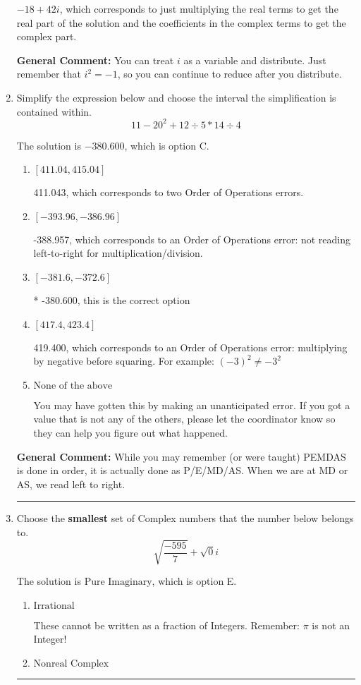 \documentclass{extbook}[14pt]
\newcommand{\litem}[1]{\item #1

\rule{\textwidth}{0.4pt}}
\begin{document}
\begin{enumerate}
{\begin{enumerate}[label=\Alph*.]
 $-18 + 42 i$, which corresponds to just multiplying the real terms to get the real part of the solution and the coefficients in the complex terms to get the complex part.
\end{enumerate}

\textbf{General Comment:} You can treat $i$ as a variable and distribute. Just remember that $i^2=-1$, so you can continue to reduce after you distribute.
}
\litem{
Simplify the expression below and choose the interval the simplification is contained within.
\[ 11 - 20^2 + 12 \div 5 * 14 \div 4 \]

The solution is \( -380.600 \), which is option C.\begin{enumerate}[label=\Alph*.]
\item \( [411.04, 415.04] \)

 411.043, which corresponds to two Order of Operations errors.
\item \( [-393.96, -386.96] \)

 -388.957, which corresponds to an Order of Operations error: not reading left-to-right for multiplication/division.
\item \( [-381.6, -372.6] \)

* -380.600, this is the correct option
\item \( [417.4, 423.4] \)

 419.400, which corresponds to an Order of Operations error: multiplying by negative before squaring. For example: $(-3)^2 \neq -3^2$
\item \( \text{None of the above} \)

 You may have gotten this by making an unanticipated error. If you got a value that is not any of the others, please let the coordinator know so they can help you figure out what happened.
\end{enumerate}

\textbf{General Comment:} While you may remember (or were taught) PEMDAS is done in order, it is actually done as P/E/MD/AS. When we are at MD or AS, we read left to right.
}
\litem{
Choose the \textbf{smallest} set of Complex numbers that the number below belongs to.
\[ \sqrt{\frac{-595}{7}}+\sqrt{0}i \]

The solution is \( \text{Pure Imaginary} \), which is option E.\begin{enumerate}[label=\Alph*.]
\item \( \text{Irrational} \)

These cannot be written as a fraction of Integers. Remember: $\pi$ is not an Integer!
\item \( \text{Nonreal Complex} \)


\end{enumerate}}
\end{enumerate}
\end{document}
